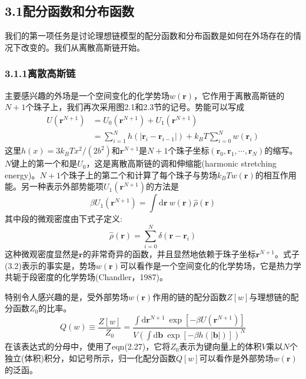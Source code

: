 \subsection{3.1配分函数和分布函数}
我们的第一项任务是讨论理想链模型的配分函数和分布函数是如何在外场存在的情况下改变的。我们从离散高斯链开始。
\subsubsection{3.1.1离散高斯链}
主要感兴趣的外场是一个空间变化的化学势场$w(\mathbf{r})$，它作用于离散高斯链的$N+1$个珠子上，我们再次采用图2.1和2.3节的记号。势能可以写成
\begin{equation}
\begin{aligned}
U(\mathbf{r}^{N+1})&=U_0(\mathbf{r}^{N+1})+U_1(\mathbf{r}^{N+1})\\
&=\sum\limits_{i=1}^Nh(\left|\mathbf{r}_i-\mathbf{r}_{i-1}\right|)+k_BT\sum\limits_{i=0}^Nw(\mathbf{r}_i)
\end{aligned}
\end{equation}
这里$h(x)=3k_BTx^2/(2b^2)$和$\mathbf{r}^{N+1}$是$N+1$个珠子坐标$(\mathbf{r}_0,\mathbf{r}_1,\cdots,\mathbf{r}_N)$的缩写。$N$键上的第一个和是$U_0$，这是离散高斯链的调和伸缩能(harmonic stretching energy)。$N+1$个珠子上的第二个和计算了每个珠子与势场$k_BTw(\mathbf{r})$的相互作用能。另一种表示外部势能项$U_1(\mathbf{r}^{N+1})$的方法是
\begin{equation}
\beta U_1(\mathbf{r}^{N+1})=\int\mathrm{d}\mathbf{r}~w(\mathbf{r})\hat{\rho}(\mathbf{r})
\end{equation}
其中段的微观密度由下式子定义:
\begin{equation}
\hat{\rho}(\mathbf{r})=\sum\limits_{i=0}^N\delta(\mathbf{r}-\mathbf{r}_i)
\end{equation}
这种微观密度显然是$\mathbf{r}$的非常奇异的函数，并且显然地依赖于珠子坐标$\mathbf{r}^{N+1}$。式子(3.2)表示的事实是，势场$w(\mathbf{r})$可以看作是一个空间变化的化学势场，它是热力学共轭于段密度的化学势场(Chandler，1987)。

特别令人感兴趣的是，受外部势场$w(\mathbf{r})$作用的链的配分函数$Z[w]$与理想链的配分函数$Z_0$的比率。
\begin{equation}
Q(w)\equiv\frac{Z[w]}{Z_0}=\frac{\int\mathrm{d}\mathbf{r}^{N+1}~\exp[-\beta U(\mathbf{r}^{N+1})]}{V(\int\mathrm{d}\mathbf{b}~\exp[-\beta h(\left|\mathbf{b}\right|)])^N}
\end{equation}
在该表达式的分母中，使用了eqn(2.27)，它将$Z_0$表示为键向量上的体积$V$乘以$N$个独立(体积)积分，如记号所示，归一化配分函数$Q[w]$可以看作是外部势场$w(\mathbf{r})$的泛函。

